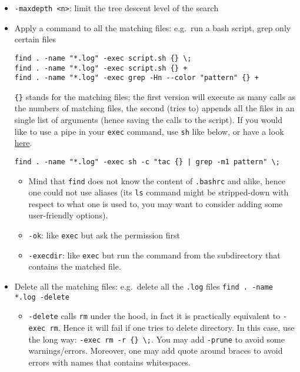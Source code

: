 \documentclass[a4paper,12pt,%
              final%
              ]{article}
\begin{document}
\begin{itemize}
\begin{itemize}
    \end{itemize}
  \item \verb|-maxdepth <n>|: limit the tree descent level of the search
  \item Apply a command to all the matching files: e.g.~run a bash script, grep only certain files
\begin{verbatim}
find . -name "*.log" -exec script.sh {} \;
find . -name "*.log" -exec script.sh {} +
find . -name "*.log" -exec grep -Hn --color "pattern" {} +
\end{verbatim}
    \verb|{}| stands for the matching files; the first version will execute as many calls as the numbers of matching files, the second (tries to) appends all the files in an single list of arguments (hence saving the calls to the script). If you would like to use a pipe in your \texttt{exec} command, use \texttt{sh} like below, or have a look \href{https://stackoverflow.com/questions/307015/how-do-i-include-a-pipe-in-my-linux-find-exec-command}{here}.
\begin{verbatim}
find . -name "*.log" -exec sh -c "tac {} | grep -m1 pattern" \;
\end{verbatim}
  \begin{itemize}
    \item Mind that \texttt{find} does not know the content of \texttt{.bashrc} and alike, hence one could not use aliases (its \texttt{ls} command might be stripped-down with respect to what one is used to, you may want to consider adding some user-friendly options).
  \end{itemize}
  \begin{itemize}
    \item \verb|-ok|: like \texttt{exec} but ask the permission first
    \item \verb|-execdir|: like \texttt{exec} but run the command from the subdirectory that contains the matched file.
  \end{itemize}
  \item Delete all the matching files: e.g.~delete all the \texttt{.log} files \texttt{find . -name *.log -delete}
    \begin{itemize}
      \item \texttt{-delete} calls \texttt{rm} under the hood, in fact it is practically equivalent to \texttt{-exec rm}. Hence it will fail if one tries to delete directory. In this case, use the long way: \verb|-exec rm -r {} \;|. You may add \verb|-prune| to avoid some warnings/errors. Moreover, one may add quote around braces to avoid errors with names that contains whitespaces.
    \end{itemize}
\end{itemize}
\end{document}
